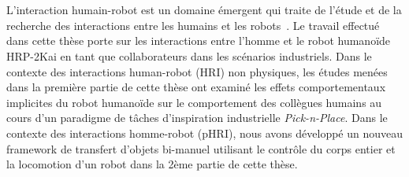 {\color{blue}\chapter*{}}
\thispagestyle{empty}


L'interaction humain-robot est un domaine émergent qui traite de l'étude et de la recherche des interactions entre les humains et les robots~\cite{goodrich2008human}. Le travail effectué dans cette thèse porte sur les interactions entre l'homme et le robot humanoïde HRP-2Kai en tant que collaborateurs dans les scénarios industriels. Dans le contexte des interactions human-robot (HRI) non physiques, les études menées dans la première partie de cette thèse ont examiné les effets comportementaux implicites du robot humanoïde sur le comportement des collègues humains au cours d'un paradigme de tâches d'inspiration industrielle \textit{Pick-n-Place}. Dans le contexte des interactions homme-robot (pHRI), nous avons développé un nouveau framework de transfert d'objets bi-manuel utilisant le contrôle du corps entier et la locomotion d'un robot dans la 2ème partie de cette thèse.\\



